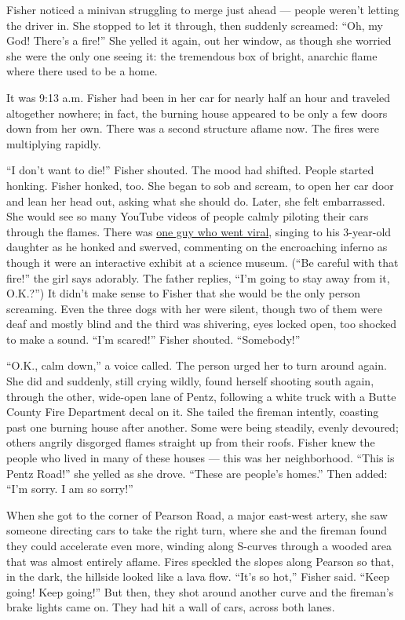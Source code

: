 Fisher noticed a minivan struggling to merge just ahead --- people
weren't letting the driver in. She stopped to let it through, then
suddenly screamed: ``Oh, my God! There's a fire!'' She yelled it again,
out her window, as though she worried she were the only one seeing it:
the tremendous box of bright, anarchic flame where there used to be a
home.

It was 9:13 a.m. Fisher had been in her car for nearly half an hour and
traveled altogether nowhere; in fact, the burning house appeared to be
only a few doors down from her own. There was a second structure aflame
now. The fires were multiplying rapidly.

``I don't want to die!'' Fisher shouted. The mood had shifted. People
started honking. Fisher honked, too. She began to sob and scream, to
open her car door and lean her head out, asking what she should do.
Later, she felt embarrassed. She would see so many YouTube videos of
people calmly piloting their cars through the flames. There was
\href{https://www.youtube.com/watch?reload=9\&time_continue=166\&v=KkkxpOX8Jgc}{one
guy who went viral}, singing to his 3-year-old daughter as he honked and
swerved, commenting on the encroaching inferno as though it were an
interactive exhibit at a science museum. (``Be careful with that fire!''
the girl says adorably. The father replies, ``I'm going to stay away
from it, O.K.?'') It didn't make sense to Fisher that she would be the
only person screaming. Even the three dogs with her were silent, though
two of them were deaf and mostly blind and the third was shivering, eyes
locked open, too shocked to make a sound. ``I'm scared!'' Fisher
shouted. ``Somebody!''

``O.K., calm down,'' a voice called. The person urged her to turn around
again. She did and suddenly, still crying wildly, found herself shooting
south again, through the other, wide-open lane of Pentz, following a
white truck with a Butte County Fire Department decal on it. She tailed
the fireman intently, coasting past one burning house after another.
Some were being steadily, evenly devoured; others angrily disgorged
flames straight up from their roofs. Fisher knew the people who lived in
many of these houses --- this was her neighborhood. ``This is Pentz
Road!'' she yelled as she drove. ``These are people's homes.'' Then
added: ``I'm sorry. I am so sorry!''

When she got to the corner of Pearson Road, a major east-west artery,
she saw someone directing cars to take the right turn, where she and the
fireman found they could accelerate even more, winding along S-curves
through a wooded area that was almost entirely aflame. Fires speckled
the slopes along Pearson so that, in the dark, the hillside looked like
a lava flow. ``It's so hot,'' Fisher said. ``Keep going! Keep going!''
But then, they shot around another curve and the fireman's brake lights
came on. They had hit a wall of cars, across both lanes.

